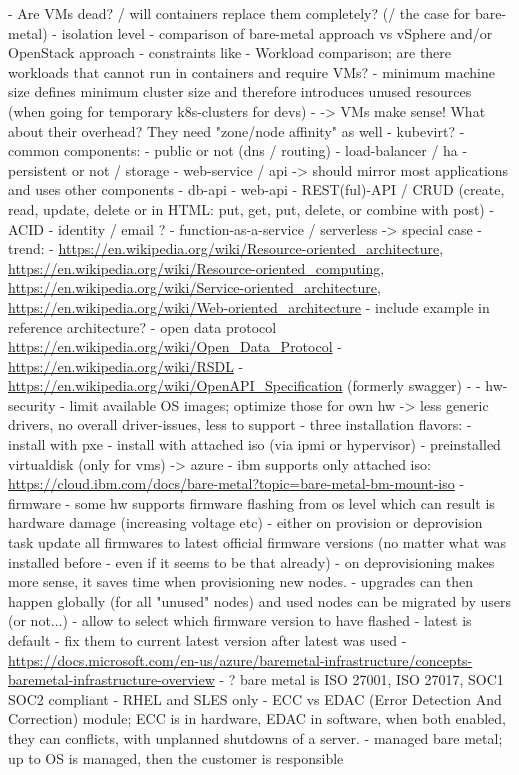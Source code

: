 - Are VMs dead? / will containers replace them completely? (/ the case for bare-metal)
  - isolation level
  - comparison of bare-metal approach vs vSphere and/or OpenStack approach
  - constraints like
    - Workload comparison; are there workloads that cannot run in containers and require VMs?
    - minimum machine size defines minimum cluster size and therefore introduces unused resources (when going for temporary k8s-clusters for devs)
  - -> VMs make sense! What about their overhead? They need "zone/node affinity" as well
  - kubevirt?
- common components:
  - public or not (dns / routing)
  - load-balancer / ha
  - persistent or not / storage
  - web-service / api -> should mirror most applications and uses other components
    - db-api
    - web-api
    - REST(ful)-API / CRUD (create, read, update, delete or in HTML: put, get, put, delete, or combine with post)
    - ACID
  - identity / email ?
  - function-as-a-service / serverless -> special case
  - trend:
    - \url{https://en.wikipedia.org/wiki/Resource-oriented_architecture}, \url{https://en.wikipedia.org/wiki/Resource-oriented_computing}, \url{https://en.wikipedia.org/wiki/Service-oriented_architecture}, \url{https://en.wikipedia.org/wiki/Web-oriented_architecture}
    - include example in reference architecture?
    - open data protocol \url{https://en.wikipedia.org/wiki/Open_Data_Protocol}
    - \url{https://en.wikipedia.org/wiki/RSDL}
    - \url{https://en.wikipedia.org/wiki/OpenAPI_Specification} (formerly swagger)
- %
- hw-security
  - limit available OS images; optimize those for own hw -> less generic drivers, no overall driver-issues, less to support
  - three installation flavors:
    - install with pxe
    - install with attached iso (via ipmi or hypervisor)
    - preinstalled virtualdisk (only for vms) -> azure
    - ibm supports only attached iso: \url{https://cloud.ibm.com/docs/bare-metal?topic=bare-metal-bm-mount-iso}
  - firmware
    - some hw supports firmware flashing from os level which can result is hardware damage (increasing voltage etc)
    - either on provision or deprovision task update all firmwares to latest official firmware versions (no matter what was installed before - even if it seems to be that already)
      - on deprovisioning makes more sense, it saves time when provisioning new nodes.
    - upgrades can then happen globally (for all "unused" nodes) and used nodes can be migrated by users (or not...)
    - allow to select which firmware version to have flashed
      - latest is default
      - fix them to current latest version after latest was used
  - \url{https://docs.microsoft.com/en-us/azure/baremetal-infrastructure/concepts-baremetal-infrastructure-overview}
    - ? bare metal is ISO 27001, ISO 27017, SOC1 SOC2 compliant
    - RHEL and SLES only
    - ECC vs EDAC (Error Detection And Correction) module; ECC is in hardware, EDAC in software, when both enabled, they can conflicts, with unplanned shutdowns of a server.
    - managed bare metal; up to OS is managed, then the customer is responsible


